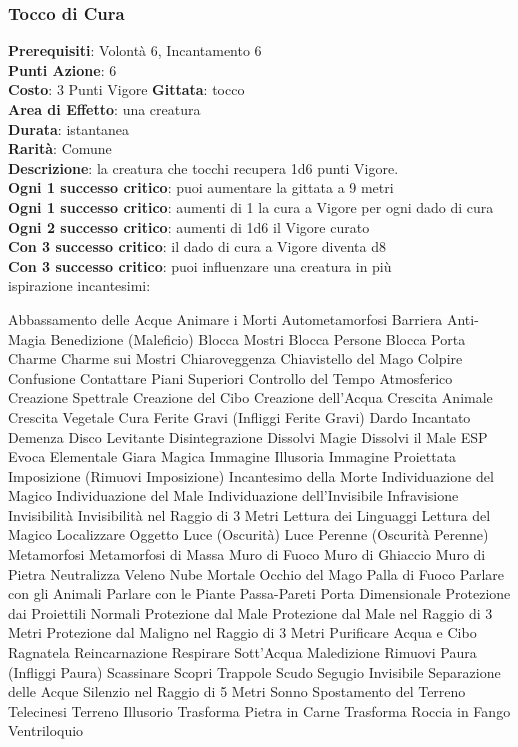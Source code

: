 \documentclass[12pt,a4paper,twoside,openany]{book}
\begin{document}
\begin{multicols}{2}
\subsubsection*{Tocco di Cura}
\textbf{Prerequisiti}: Volontà 6, Incantamento 6\\
\textbf{Punti Azione}: 6\\
\textbf{Costo}: 3 Punti Vigore
\textbf{Gittata}: tocco \\
\textbf{Area di Effetto}: una creatura\\
\textbf{Durata}: istantanea\\
\textbf{Rarità}: Comune\\
\textbf{Descrizione}: la creatura che tocchi recupera 1d6 punti Vigore.\\
\textbf{Ogni 1 successo critico}: puoi aumentare la gittata a 9 metri\\
\textbf{Ogni 1 successo critico}: aumenti di 1 la cura a Vigore per ogni dado di cura
\textbf{Ogni 2 successo critico}: aumenti di 1d6 il Vigore curato\\
\textbf{Con 3 successo critico}: il dado di cura a Vigore diventa d8\\
\textbf{Con 3 successo critico}: puoi influenzare una creatura in più\\

ispirazione incantesimi:

Abbassamento delle Acque
Animare i Morti
Autometamorfosi
Barriera Anti-Magia
Benedizione (Maleficio)
Blocca Mostri
Blocca Persone
Blocca Porta
Charme
Charme sui Mostri
Chiaroveggenza
Chiavistello del Mago
Colpire
Confusione
Contattare Piani Superiori
Controllo del Tempo Atmosferico
Creazione Spettrale
Creazione del Cibo
Creazione dell’Acqua
Crescita Animale
Crescita Vegetale
Cura Ferite Gravi (Infliggi Ferite Gravi)
Dardo Incantato
Demenza
Disco Levitante
Disintegrazione
Dissolvi Magie
Dissolvi il Male
ESP
Evoca Elementale
Giara Magica
Immagine Illusoria
Immagine Proiettata
Imposizione (Rimuovi Imposizione)
Incantesimo della Morte
Individuazione del Magico
Individuazione del Male
Individuazione dell'Invisibile
Infravisione
Invisibilità
Invisibilità nel Raggio di 3 Metri
Lettura dei Linguaggi
Lettura del Magico
Localizzare Oggetto
Luce (Oscurità)
Luce Perenne (Oscurità Perenne)
Metamorfosi
Metamorfosi di Massa
Muro di Fuoco
Muro di Ghiaccio
Muro di Pietra
Neutralizza Veleno
Nube Mortale
Occhio del Mago
Palla di Fuoco
Parlare con gli Animali
Parlare con le Piante
Passa-Pareti
Porta Dimensionale
Protezione dai Proiettili Normali
Protezione dal Male
Protezione dal Male nel Raggio di 3 Metri
Protezione dal Maligno nel Raggio di 3 Metri
Purificare Acqua e Cibo
Ragnatela
Reincarnazione
Respirare Sott’Acqua
Maledizione
Rimuovi Paura (Infliggi Paura)
Scassinare
Scopri Trappole
Scudo
Segugio Invisibile
Separazione delle Acque
Silenzio nel Raggio di 5 Metri
Sonno
Spostamento del Terreno
Telecinesi
Terreno Illusorio
Trasforma Pietra in Carne
Trasforma Roccia in Fango
Ventriloquio




\end{multicols}
\end{document}
